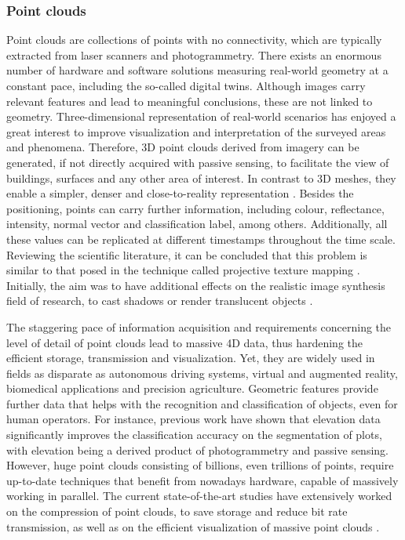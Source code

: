 \subsubsection{Point clouds}

Point clouds are collections of points with no connectivity, which are typically extracted from laser scanners and photogrammetry. There exists an enormous number of hardware and software solutions measuring real-world geometry at a constant pace, including the so-called digital twins. Although images carry relevant features and lead to meaningful conclusions, these are not linked to geometry. Three-dimensional representation of real-world scenarios has enjoyed a great interest to improve visualization and interpretation of the surveyed areas and phenomena. Therefore, 3D point clouds derived from imagery can be generated, if not directly acquired with passive sensing, to facilitate the view of buildings, surfaces and any other area of interest. In contrast to 3D meshes, they enable a simpler, denser and close-to-reality representation \cite{cao_3d_2019}. Besides the positioning, points can carry further information, including colour, reflectance, intensity, normal vector and classification label, among others. Additionally, all these values can be replicated at different timestamps throughout the time scale. Reviewing the scientific literature, it can be concluded that this problem is similar to that posed in the technique called projective texture mapping \cite{debevec_efficient_1998, heckbert_survey_1986}. Initially, the aim was to have additional effects on the realistic image synthesis field of research, to cast shadows or render translucent objects \cite{dachsbacher_translucent_2003}.

The staggering pace of information acquisition and requirements concerning the level of detail of point clouds lead to massive 4D data, thus hardening the efficient storage, transmission and visualization. Yet, they are widely used in fields as disparate as autonomous driving systems, virtual and augmented reality, biomedical applications and precision agriculture. Geometric features provide further data that helps with the recognition and classification of objects, even for human operators. For instance, previous work \cite{barros_multispectral_2022, kerkech_vine_2020, de_castro_3-d_2018} have shown that elevation data significantly improves the classification accuracy on the segmentation of plots, with elevation being a derived product of photogrammetry and passive sensing. However, huge point clouds consisting of billions, even trillions of points, require up-to-date techniques that benefit from nowadays hardware, capable of massively working in parallel. The current state-of-the-art studies have extensively worked on the compression of point clouds, to save storage and reduce bit rate transmission, as well as on the efficient visualization of massive point clouds \cite{schutz_gpu-accelerated_2023, van_oosterom_organizing_2022}. 

